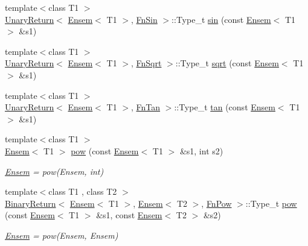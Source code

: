 \begin{DoxyCompactItemize}
\item 
{\footnotesize template$<$class T1 $>$ }\\\mbox{\hyperlink{structENSEM_1_1UnaryReturn}{Unary\+Return}}$<$ \mbox{\hyperlink{classENSEM_1_1Ensem}{Ensem}}$<$ T1 $>$, \mbox{\hyperlink{structENSEM_1_1FnSin}{Fn\+Sin}} $>$\+::Type\+\_\+t \mbox{\hyperlink{group__eensem_ga7c76c7e409f4cb0cb13cdb648ac99814}{sin}} (const \mbox{\hyperlink{classENSEM_1_1Ensem}{Ensem}}$<$ T1 $>$ \&s1)
\item 
{\footnotesize template$<$class T1 $>$ }\\\mbox{\hyperlink{structENSEM_1_1UnaryReturn}{Unary\+Return}}$<$ \mbox{\hyperlink{classENSEM_1_1Ensem}{Ensem}}$<$ T1 $>$, \mbox{\hyperlink{structENSEM_1_1FnSqrt}{Fn\+Sqrt}} $>$\+::Type\+\_\+t \mbox{\hyperlink{group__eensem_gac8bfa621e2dd6c732c311e9ffafb6eaf}{sqrt}} (const \mbox{\hyperlink{classENSEM_1_1Ensem}{Ensem}}$<$ T1 $>$ \&s1)
\item 
{\footnotesize template$<$class T1 $>$ }\\\mbox{\hyperlink{structENSEM_1_1UnaryReturn}{Unary\+Return}}$<$ \mbox{\hyperlink{classENSEM_1_1Ensem}{Ensem}}$<$ T1 $>$, \mbox{\hyperlink{structENSEM_1_1FnTan}{Fn\+Tan}} $>$\+::Type\+\_\+t \mbox{\hyperlink{group__eensem_ga56d3def0223da8c49dd2210228349eb0}{tan}} (const \mbox{\hyperlink{classENSEM_1_1Ensem}{Ensem}}$<$ T1 $>$ \&s1)
\item 
{\footnotesize template$<$class T1 $>$ }\\\mbox{\hyperlink{classENSEM_1_1Ensem}{Ensem}}$<$ T1 $>$ \mbox{\hyperlink{group__eensem_ga038873ee1f1a6dfb9540558711f11110}{pow}} (const \mbox{\hyperlink{classENSEM_1_1Ensem}{Ensem}}$<$ T1 $>$ \&s1, int s2)
\begin{DoxyCompactList}\small\item\em \mbox{\hyperlink{classENSEM_1_1Ensem}{Ensem}} = pow(\+Ensem, int) \end{DoxyCompactList}\item 
{\footnotesize template$<$class T1 , class T2 $>$ }\\\mbox{\hyperlink{structENSEM_1_1BinaryReturn}{Binary\+Return}}$<$ \mbox{\hyperlink{classENSEM_1_1Ensem}{Ensem}}$<$ T1 $>$, \mbox{\hyperlink{classENSEM_1_1Ensem}{Ensem}}$<$ T2 $>$, \mbox{\hyperlink{structENSEM_1_1FnPow}{Fn\+Pow}} $>$\+::Type\+\_\+t \mbox{\hyperlink{group__eensem_ga08a0a61df39df2d4038eed616fcfa56b}{pow}} (const \mbox{\hyperlink{classENSEM_1_1Ensem}{Ensem}}$<$ T1 $>$ \&s1, const \mbox{\hyperlink{classENSEM_1_1Ensem}{Ensem}}$<$ T2 $>$ \&s2)
\begin{DoxyCompactList}\small\item\em \mbox{\hyperlink{classENSEM_1_1Ensem}{Ensem}} = pow(\+Ensem, Ensem) \end{DoxyCompactList}\item 

\end{DoxyCompactItemize}
